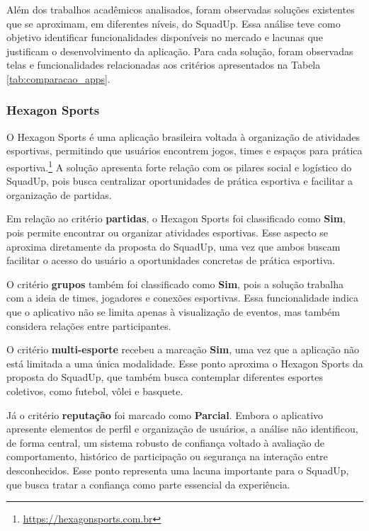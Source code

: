 \documentclass[a4paper, 12pt]{article}
\begin{document}
\begin{justify}
Além dos trabalhos acadêmicos analisados, foram observadas soluções existentes que se aproximam, em diferentes níveis, do SquadUp. Essa análise teve como objetivo identificar funcionalidades disponíveis no mercado e lacunas que justificam o desenvolvimento da aplicação. Para cada solução, foram observadas telas e funcionalidades relacionadas aos critérios apresentados na Tabela \ref{tab:comparacao_apps}.

\subsubsection{Hexagon Sports}

O Hexagon Sports é uma aplicação brasileira voltada à organização de atividades esportivas, permitindo que usuários encontrem jogos, times e espaços para prática esportiva.\footnote{\url{https://hexagonsports.com.br}} A solução apresenta forte relação com os pilares social e logístico do SquadUp, pois busca centralizar oportunidades de prática esportiva e facilitar a organização de partidas.

Em relação ao critério \textbf{partidas}, o Hexagon Sports foi classificado como \textbf{Sim}, pois permite encontrar ou organizar atividades esportivas. Esse aspecto se aproxima diretamente da proposta do SquadUp, uma vez que ambos buscam facilitar o acesso do usuário a oportunidades concretas de prática esportiva.

O critério \textbf{grupos} também foi classificado como \textbf{Sim}, pois a solução trabalha com a ideia de times, jogadores e conexões esportivas. Essa funcionalidade indica que o aplicativo não se limita apenas à visualização de eventos, mas também considera relações entre participantes.

O critério \textbf{multi-esporte} recebeu a marcação \textbf{Sim}, uma vez que a aplicação não está limitada a uma única modalidade. Esse ponto aproxima o Hexagon Sports da proposta do SquadUp, que também busca contemplar diferentes esportes coletivos, como futebol, vôlei e basquete.

Já o critério \textbf{reputação} foi marcado como \textbf{Parcial}. Embora o aplicativo apresente elementos de perfil e organização de usuários, a análise não identificou, de forma central, um sistema robusto de confiança voltado à avaliação de comportamento, histórico de participação ou segurança na interação entre desconhecidos. Esse ponto representa uma lacuna importante para o SquadUp, que busca tratar a confiança como parte essencial da experiência.


\end{justify}
\end{document}
